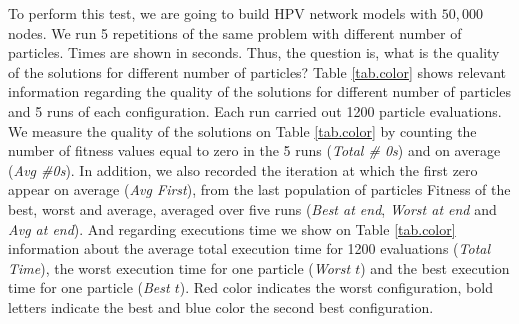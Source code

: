 To perform this test, we are going to build HPV network models with $50,000$ nodes. We run 5 repetitions of the same problem with different number of particles. Times are shown in seconds. Thus, the question is, what is the quality of the solutions for different number of particles? Table \ref{tab.color} shows relevant information regarding the quality of the solutions for different number of particles and 5 runs of each configuration. Each run carried out 1200 particle evaluations. We measure the quality of the solutions on Table \ref{tab.color} by counting the number of fitness values equal to zero in the 5 runs (\textit{Total \# 0s}) and on average (\textit{Avg \#0s}). In addition, we also recorded the iteration at which the first zero appear on average (\textit{Avg  First}), from the last population of particles Fitness of the best, worst and average, averaged over five runs (\textit{Best at end}, \textit{Worst at end} and \textit{Avg at end}). And regarding executions time we show on Table  \ref{tab.color} information about the average total execution time for 1200 evaluations (\textit{Total Time}), the  worst execution time for one particle (\textit{Worst $t$}) and the best execution time for one particle (\textit{Best $t$}). Red color indicates the worst configuration, bold letters indicate the best and blue color the second best configuration.

